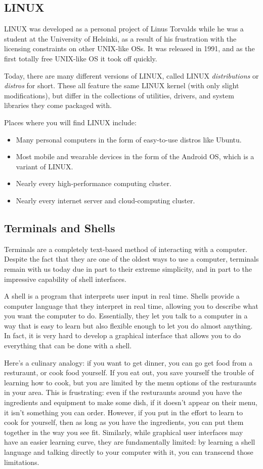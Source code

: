 \documentclass[aps,showpacs,prd,notitlepage,preprintnumbers,amsmath,amssymb,letterpaper]{revtex4}
\begin{document}
\subsection{LINUX}
LINUX was developed as a personal project of Linus Torvalds while he was a student at the University of Helsinki, as a result of his frustration with the licensing constraints on other UNIX-like OSs.
It was released in 1991, and as the first totally free UNIX-like OS it took off quickly.

Today, there are many different versions of LINUX, called LINUX \textit{distributions} or \textit{distros} for short.
These all feature the same LINUX kernel (with only slight modifications), but differ in the collections of utilities, drivers, and system libraries they come packaged with.

Places where you will find LINUX include:
\begin{itemize}
  \item Many personal computers in the form of easy-to-use distros like Ubuntu.
  \item Most mobile and wearable devices in the form of the Android OS, which is a variant of LINUX.
  \item Nearly every high-performance computing cluster.
  \item Nearly every internet server and cloud-computing cluster.
\end{itemize}

\subsection{Terminals and Shells}
Terminals are a completely text-based method of interacting with a computer.
Despite the fact that they are one of the oldest ways to use a computer, terminals remain with us today
due in part to their extreme simplicity, and in part to the impressive capability of shell interfaces.

A shell is a program that interprets user input in real time.
Shells provide a computer language that they interpret in real time, allowing you to describe what you want the computer to do.
Essentially, they let you talk to a computer in a way that is easy to learn but also flexible enough to let you do almost anything.
In fact, it is very hard to develop a graphical interface that allows you to do everything that can be done with a shell.

Here's a culinary analogy: if you want to get dinner, you can go get food from a resturaunt, or cook food yourself.
If you eat out, you save yourself the trouble of learning how to cook, but you are limited by the menu options of the resturaunts in your area.
This is frustrating: even if the resturaunts around you have the ingredients and equipment to make some dish, if it doesn't appear on their menu, it isn't something you can order.
However, if you put in the effort to learn to cook for yourself, then as long as you have the ingredients, you can put them together in the way you see fit.
Similarly, while graphical user interfaces may have an easier learning curve, they are fundamentally limited: by learning a shell language and talking directly to your computer with it, you can transcend those limitations.
\end{document}
